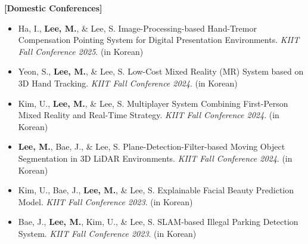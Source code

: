 \documentclass[letterpaper,11pt]{article}
\newcommand{\resumeItem}[1]{
  \item\small{
    {#1 \vspace{0pt}}
  }
}
\newcommand{\resumeSubHeadingListStart}{\begin{itemize}[leftmargin=*]}
\newcommand{\resumeSubHeadingListEnd}{\end{itemize}}
\begin{document}
\textbf{[Domestic Conferences]}
\resumeSubHeadingListStart
\resumeItem{Ha, I., \textbf{Lee, M.}, \& Lee, S. Image-Processing-based Hand-Tremor Compensation Pointing System for Digital Presentation Environments. \textit{KIIT Fall Conference 2025}. (in Korean)}
\resumeItem{Yeon, S., \textbf{Lee, M.}, \& Lee, S. Low-Cost Mixed Reality (MR) System based on 3D Hand Tracking. \textit{KIIT Fall Conference 2024}. (in Korean)}
\resumeItem{Kim, U., \textbf{Lee, M.}, \& Lee, S. Multiplayer System Combining First-Person Mixed Reality and Real-Time Strategy. \textit{KIIT Fall Conference 2024}. (in Korean)}
\resumeItem{\textbf{Lee, M.}, Bae, J., \& Lee, S. Plane-Detection-Filter-based Moving Object Segmentation in 3D LiDAR Environments. \textit{KIIT Fall Conference 2024}. (in Korean)}
\resumeItem{Kim, U., Bae, J., \textbf{Lee, M.}, \& Lee, S. Explainable Facial Beauty Prediction Model. \textit{KIIT Fall Conference 2023}. (in Korean)}
\resumeItem{Bae, J., \textbf{Lee, M.}, Kim, U., \& Lee, S. SLAM-based Illegal Parking Detection System. \textit{KIIT Fall Conference 2023}. (in Korean)}
\resumeSubHeadingListEnd

\end{document}
